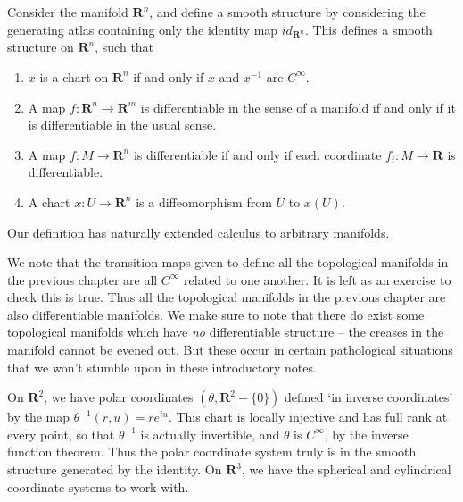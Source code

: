 \begin{example}
    Consider the manifold $\mathbf{R}^n$, and define a smooth structure by considering the generating atlas containing only the identity map $id_{\mathbf{R}^n}$. This defines a smooth structure on $\mathbf{R}^n$, such that
    \begin{enumerate}
        \item $x$ is a chart on $\mathbf{R}^n$ if and only if $x$ and $x^{-1}$ are $C^\infty$.
        \item A map $f:\mathbf{R}^n \to \mathbf{R}^m$ is differentiable in the sense of a manifold if and only if it is differentiable in the usual sense.
        \item A map $f:M \to \mathbf{R}^n$ is differentiable if and only if each coordinate $f_i:M \to \mathbf{R}$ is differentiable.
        \item A chart $x:U \to \mathbf{R}^n$ is a diffeomorphism from $U$ to $x(U)$.
    \end{enumerate}
    Our definition has naturally extended calculus to arbitrary manifolds.
\end{example}

We note that the transition maps given to define all the topological manifolds in the previous chapter are all $C^\infty$ related to one another. It is left as an exercise to check this is true. Thus all the topological manifolds in the previous chapter are also differentiable manifolds. We make sure to note that there do exist some topological manifolds which have {\it no} differentiable structure -- the creases in the manifold cannot be evened out. But these occur in certain pathological situations that we won't stumble upon in these introductory notes.

\begin{example}
    On $\mathbf{R}^2$, we have polar coordinates $(\theta, \mathbf{R}^2 - \{0\})$ defined `in inverse coordinates' by the map $\theta^{-1}(r,u) = re^{iu}$. This chart is locally injective and has full rank at every point, so that $\theta^{-1}$ is actually invertible, and $\theta$ is $C^\infty$, by the inverse function theorem. Thus the polar coordinate system truly is in the smooth structure generated by the identity. On $\mathbf{R}^3$, we have the spherical and cylindrical coordinate systems to work with.
\end{example}

